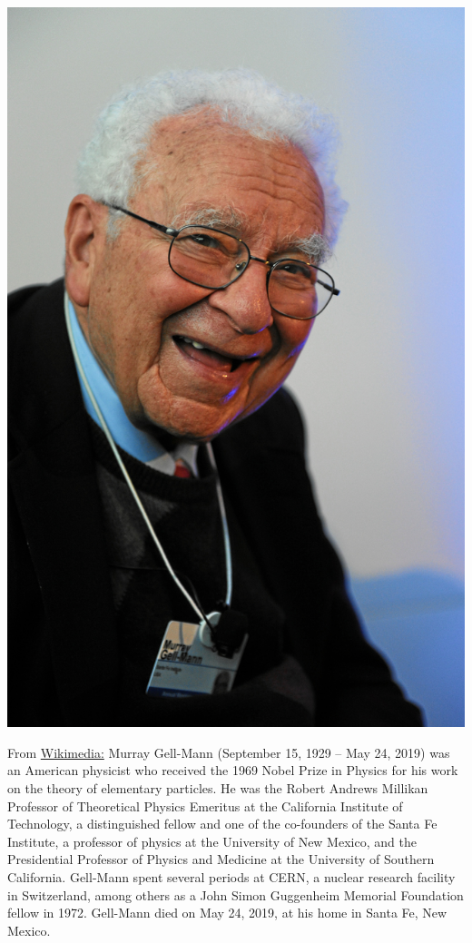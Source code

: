 \documentclass[../main.tex]{subfiles}
\begin{document}
\begin{marginfigure}
	\includegraphics[width=1\linewidth]{images/Murray_Gell-Mann_-_World_Economic_Forum_Annual_Meeting_2012.jpg}
	\caption[Photo of Murray Gell-Mann]{From \href{https://commons.wikimedia.org/wiki/File:Murray_Gell-Mann_-_World_Economic_Forum_Annual_Meeting_2012.jpg}{Wikimedia:} Murray Gell-Mann (September 15, 1929 – May 24, 2019) was an American physicist who received the 1969 Nobel Prize in Physics for his work on the theory of elementary particles. He was the Robert Andrews Millikan Professor of Theoretical Physics Emeritus at the California Institute of Technology, a distinguished fellow and one of the co-founders of the Santa Fe Institute, a professor of physics at the University of New Mexico, and the Presidential Professor of Physics and Medicine at the University of Southern California. Gell-Mann spent several periods at CERN, a nuclear research facility in Switzerland, among others as a John Simon Guggenheim Memorial Foundation fellow in 1972. Gell-Mann died on May 24, 2019, at his home in Santa Fe, New Mexico. }
\end{marginfigure}
\end{document}
